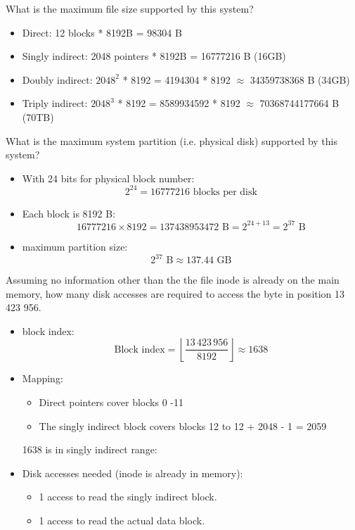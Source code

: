 \documentclass{article}
\begin{document}
\begin{enumerate}[label=\textbf{\makebox[1cm][l]{\Huge\text{(\stylishfont\alph*)}}}, leftmargin=!, labelindent=0pt]
    \item What is the maximum file size supported by this system?
    
    \begin{itemize}
        \item Direct: 12 blocks * 8192B = 98304 B
        \item Singly indirect: 2048 pointers * 8192B = 16777216 B (16GB)
        \item Doubly indirect: \(2048^2\) * 8192 = 4194304 * 8192 \(\approx\) 34359738368 B (34GB)
        \item Triply indirect: \(2048^3\) * 8192 = 8589934592 * 8192 \(\approx\) 70368744177664 B (70TB)
    \end{itemize}
    
    \item What is the maximum system partition (i.e. physical disk) supported by this
    system?
    \begin{itemize}
        \item With 24 bits for physical block number:
          \[
          2^{24} = 16777216 \text{ blocks per disk}
          \]
        \item Each block is 8192 B:
          \[
          16777216 \times 8192 = 137438953472 \text{ B} = 2^{24+13} = 2^{37} \text{ B}
          \]
        \item maximum partition size:
          \[
          2^{37} \text{ B} \approx 137.44 \text{ GB}
          \]
      \end{itemize}

    \item Assuming no information other than the the file inode is already on
    the main memory, how many disk accesses are required to access the byte in
    position 13 423 956.

    \begin{itemize}[leftmargin=2em]
        \item block index:  
          \[
          \text{Block index} = \left\lfloor \frac{13\,423\,956}{8192} \right\rfloor \approx 1638
          \]
        \item Mapping:
          \begin{itemize}
            \item Direct pointers cover blocks 0 -11
            \item The singly indirect block covers blocks 12 to 12 + 2048 - 1 = 2059
          \end{itemize}
          1638 is in singly indirect range:
        \item Disk accesses needed (inode is already in memory):
          \begin{itemize}
            \item 1 access to read the singly indirect block.
            \item 1 access to read the actual data block.
          \end{itemize}
      \end{itemize}
\end{enumerate}
\end{document}
